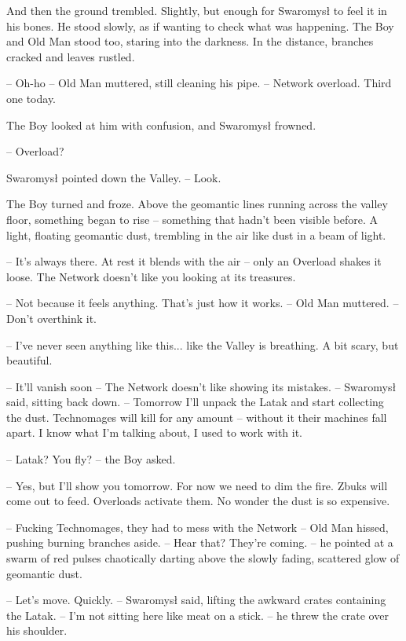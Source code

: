 \par\indent And then the ground trembled. Slightly, but enough for Swaromysł to feel it in his bones. He stood slowly, as if wanting to check what was happening. The Boy and Old Man stood too, staring into the darkness. In the distance, branches cracked and leaves rustled. 
\par\noindent-- Oh-ho -- Old Man muttered, still cleaning his pipe. -- Network overload. Third one today. 
\par\indent The Boy looked at him with confusion, and Swaromysł frowned. 
\par\noindent-- Overload? 
\par\indent Swaromysł pointed down the Valley. -- Look. 
\par\indent The Boy turned and froze. Above the geomantic lines running across the valley floor, something began to rise -- something that hadn't been visible before. A light, floating geomantic dust, trembling in the air like dust in a beam of light. 
\par\indent-- It's always there. At rest it blends with the air -- only an Overload shakes it loose. The Network doesn't like you looking at its treasures. 
\par\indent-- Not because it feels anything. That's just how it works. -- Old Man muttered. -- Don't overthink it. 
\par\indent-- I've never seen anything like this... like the Valley is breathing. A bit scary, but beautiful. 
\par\indent-- It'll vanish soon -- The Network doesn't like showing its mistakes. -- Swaromysł said, sitting back down. -- Tomorrow I'll unpack the Latak and start collecting the dust. Technomages will kill for any amount -- without it their machines fall apart. I know what I'm talking about, I used to work with it. 
\par\indent-- Latak? You fly? -- the Boy asked. 
\par\indent-- Yes, but I'll show you tomorrow. For now we need to dim the fire. Zbuks will come out to feed. Overloads activate them. No wonder the dust is so expensive. 
\par\indent-- Fucking Technomages, they had to mess with the Network -- Old Man hissed, pushing burning branches aside. -- Hear that? They're coming. -- he pointed at a swarm of red pulses chaotically darting above the slowly fading, scattered glow of geomantic dust. 
\par\indent-- Let's move. Quickly. -- Swaromysł said, lifting the awkward crates containing the Latak. -- I'm not sitting here like meat on a stick. -- he threw the crate over his shoulder. 
